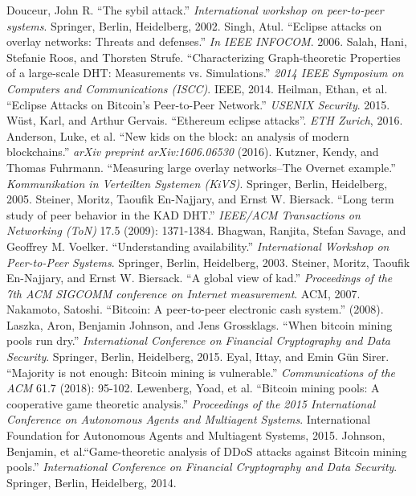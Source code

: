 \documentclass[10pt,conference,final]{IEEEtran}
\begin{document}
\begin{thebibliography}{99}
Douceur, John R. ``The sybil attack.'' \emph{International workshop on peer-to-peer systems}. Springer, Berlin, Heidelberg, 2002.
Singh, Atul. ``Eclipse attacks on overlay networks: Threats and defenses.'' \emph{In IEEE INFOCOM}. 2006.
Salah, Hani, Stefanie Roos, and Thorsten Strufe. ``Characterizing Graph-theoretic Properties of a large-scale DHT: Measurements vs. Simulations.'' \emph{2014 IEEE Symposium on Computers and Communications (ISCC)}. IEEE, 2014.
Heilman, Ethan, et al. ``Eclipse Attacks on Bitcoin's Peer-to-Peer Network.'' \emph{USENIX Security}. 2015.
W\"ust, Karl, and Arthur Gervais. ``Ethereum eclipse attacks''. \emph{ETH Zurich}, 2016.
Anderson, Luke, et al. ``New kids on the block: an analysis of modern blockchains.'' \emph{arXiv preprint arXiv:1606.06530} (2016).
Kutzner, Kendy, and Thomas Fuhrmann. ``Measuring large overlay networks--The Overnet example.'' \emph{Kommunikation in Verteilten Systemen (KiVS)}. Springer, Berlin, Heidelberg, 2005.
Steiner, Moritz, Taoufik En-Najjary, and Ernst W. Biersack. ``Long term study of peer behavior in the KAD DHT.'' \emph{IEEE/ACM Transactions on Networking (ToN)} 17.5 (2009): 1371-1384.
Bhagwan, Ranjita, Stefan Savage, and Geoffrey M. Voelker. ``Understanding availability.'' \emph{International Workshop on Peer-to-Peer Systems}. Springer, Berlin, Heidelberg, 2003.
Steiner, Moritz, Taoufik En-Najjary, and Ernst W. Biersack. ``A global view of kad.'' \emph{Proceedings of the 7th ACM SIGCOMM conference on Internet measurement}. ACM, 2007.
Nakamoto, Satoshi. ``Bitcoin: A peer-to-peer electronic cash system.'' (2008).
Laszka, Aron, Benjamin Johnson, and Jens Grossklags. ``When bitcoin mining pools run dry.'' \emph{International Conference on Financial Cryptography and Data Security}. Springer, Berlin, Heidelberg, 2015.
Eyal, Ittay, and Emin Gün Sirer. ``Majority is not enough: Bitcoin mining is vulnerable.'' \emph{Communications of the ACM} 61.7 (2018): 95-102.
Lewenberg, Yoad, et al. ``Bitcoin mining pools: A cooperative game theoretic analysis.'' \emph{Proceedings of the 2015 International Conference on Autonomous Agents and Multiagent Systems}. International Foundation for Autonomous Agents and Multiagent Systems, 2015.
Johnson, Benjamin, et al.``Game-theoretic analysis of DDoS attacks against Bitcoin mining pools.'' \emph{International Conference on Financial Cryptography and Data Security}. Springer, Berlin, Heidelberg, 2014.

\end{thebibliography}
\end{document}
